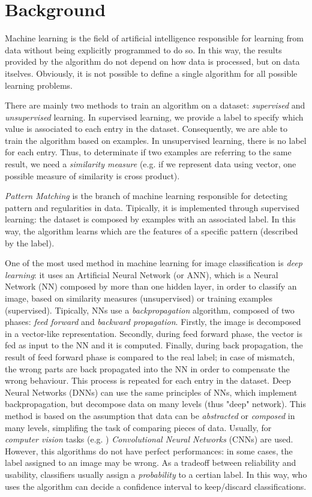 \section{Background}
\label{sec:background}

Machine learning is the field of artificial intelligence responsible for learning from data without being explicitly programmed to do so. In this way, the results provided by the algorithm do not depend on how data is processed, but on data itselves. Obviously, it is not possible to define a single algorithm for all possible learning problems.

There are mainly two methods to train an algorithm on a dataset: \textit{supervised} and \textit{unsupervised} learning. In supervised learning, we provide a label to specify which value is associated to each entry in the dataset. Consequently, we are able to train the algorithm based on examples. In unsupervised learning, there is no label for each entry. Thus, to determinate if two examples are referring to the same result, we need a \textit{similarity measure} (e.g. if we represent data using vector, one possible measure of similarity is cross product).

\textit{Pattern Matching} is the branch of machine learning responsible for detecting pattern and regularities in data. Tipically, it is implemented through supervised learning: the dataset is composed by examples with an associated label. In this way, the algorithm learns which are the features of a specific pattern (described by the label).

One of the most used method in machine learning for image classification is \textit{deep learning}: it uses an Artificial Neural Network (or ANN), which is a Neural Network (NN) composed by more than one hidden layer, in order to classify an image, based on similarity measures (unsupervised) or training examples (supervised). Tipically, NNs use a \textit{backpropagation} algorithm, composed of two phases: \textit{feed forward} and \textit{backward propagation}. Firstly, the image is decomposed in a vector-like representation. Secondly, during feed forward phase, the vector is fed as input to the NN and it is computed. Finally, during back propagation, the result of feed forward phase is compared to the real label; in case of mismatch, the wrong parts are back propagated into the NN in order to compensate the wrong behaviour. This process is repeated for each entry in the dataset.
Deep Neural Networks (DNNs) can use the same principles of NNs, which implement backpropagation, but decompose data on many levels (thus "deep" network). This method is based on the assumption that data can be \textit{abstracted} or \textit{composed} in many levels, simplifing the task of comparing pieces of data.
Usually, for \textit{computer vision} tasks (e.g. \cite{Handwritten}) \textit{Convolutional Neural Networks} (CNNs) are used\cite{CNN}.
However, this algorithms do not have perfect performances: in some cases, the label assigned to an image may be wrong. As a tradeoff between reliability and usability, classifiers usually assign a \textit{probability} to a certian label. In this way, who uses the algorithm can decide a confidence interval to keep/discard classifications. 